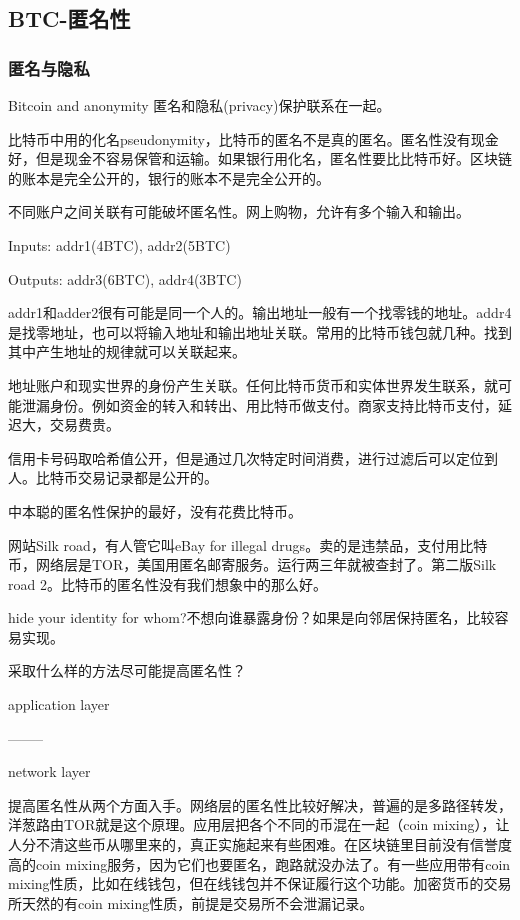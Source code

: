 \documentclass[10pt]{ctexart}
\begin{document}
\subsection{BTC-匿名性}
\subsubsection{匿名与隐私}
Bitcoin and anonymity
匿名和隐私(privacy)保护联系在一起。

比特币中用的化名pseudonymity，比特币的匿名不是真的匿名。匿名性没有现金好，但是现金不容易保管和运输。如果银行用化名，匿名性要比比特币好。区块链的账本是完全公开的，银行的账本不是完全公开的。

不同账户之间关联有可能破坏匿名性。网上购物，允许有多个输入和输出。

Inputs: addr1(4BTC), addr2(5BTC)

Outputs: addr3(6BTC), addr4(3BTC)

addr1和adder2很有可能是同一个人的。输出地址一般有一个找零钱的地址。addr4是找零地址，也可以将输入地址和输出地址关联。常用的比特币钱包就几种。找到其中产生地址的规律就可以关联起来。

地址账户和现实世界的身份产生关联。任何比特币货币和实体世界发生联系，就可能泄漏身份。例如资金的转入和转出、用比特币做支付。商家支持比特币支付，延迟大，交易费贵。

信用卡号码取哈希值公开，但是通过几次特定时间消费，进行过滤后可以定位到人。比特币交易记录都是公开的。

中本聪的匿名性保护的最好，没有花费比特币。

网站Silk road，有人管它叫eBay for illegal drugs。卖的是违禁品，支付用比特币，网络层是TOR，美国用匿名邮寄服务。运行两三年就被查封了。第二版Silk road 2。比特币的匿名性没有我们想象中的那么好。

hide your identity for whom?不想向谁暴露身份？如果是向邻居保持匿名，比较容易实现。

采取什么样的方法尽可能提高匿名性？

application layer

--------

network layer

提高匿名性从两个方面入手。网络层的匿名性比较好解决，普遍的是多路径转发，洋葱路由TOR就是这个原理。应用层把各个不同的币混在一起（coin mixing），让人分不清这些币从哪里来的，真正实施起来有些困难。在区块链里目前没有信誉度高的coin mixing服务，因为它们也要匿名，跑路就没办法了。有一些应用带有coin mixing性质，比如在线钱包，但在线钱包并不保证履行这个功能。加密货币的交易所天然的有coin mixing性质，前提是交易所不会泄漏记录。
\end{document}
